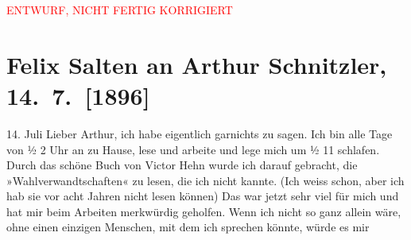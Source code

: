 
\begin{center}
            \textcolor{red}{ENTWURF, NICHT FERTIG KORRIGIERT}
                      \end{center}
            
         
         \renewcommand{\erwaehntePersonen}{Personen: Richard Beer-Hofmann, Victor Hehn, Ottilie Salten}
         \renewcommand{\erwaehnteOrte}{Orte: Kopenhagen, Trondheim, Wien}
         \renewcommand{\erwaehnteWerke}{Werke: Die Wahlverwandtschaften, Über Goethes Hermann und Dorothea}
               \section[Felix Salten an Arthur Schnitzler, 14. 7. {[}1896{]}]{ Felix Salten an Arthur Schnitzler, 14. 7. {[}1896{]}}\nopagebreak{}\rehead{ }\begin{ledgroupsized}[t]{13cm}\normalsize\beginnumbering \toendnotes[C]{\smallbreak\pagebreak[2]} 
\pstart
           \raggedleft{}{\pb}14. Juli\pend
           \pstart
           Lieber Arthur, ich habe eigentlich garnichts zu sagen. Ich bin alle
               Tage von ½ 2 Uhr an zu Hause, lese und arbeite und lege mich um ½ 11 schlafen. Durch
               das schöne Buch von Victor Hehn  wurde ich darauf gebracht, die »Wahlverwandtschaften« zu lesen, die ich nicht kannte. (Ich
               weiss schon, aber ich hab sie vor acht Jahren nicht lesen können) Das war jetzt sehr
               viel für mich und hat mir beim Arbeiten merkwürdig geholfen. Wenn ich nicht so ganz
               allein wäre, ohne einen einzigen Menschen, mit dem ich sprechen könnte, würde es mir

\end{ledgroupsized}
